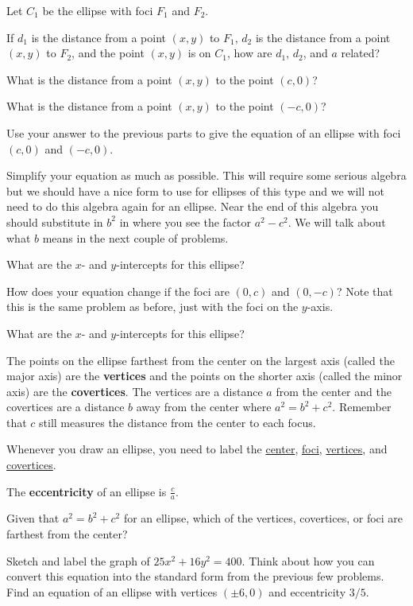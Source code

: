 \bq Let $C_1$ be the ellipse with foci $F_1$ and $F_2$.
\be
\item If $d_1$ is the distance from a point $(x,y)$ to $F_1$, $d_2$ is the distance from a point $(x,y)$ to $F_2$, and the point $(x,y)$ is on $C_1$, how are $d_1$, $d_2$, and $a$ related?
\item What is the distance from a point $(x,y)$ to the point $(c,0)$?
\item What is the distance from a point $(x,y)$ to the point $(-c,0)$?
\item Use your answer to the previous parts to give the equation of an ellipse with foci $(c,0)$ and $(-c,0)$.
\item Simplify your equation as much as possible. This will require some serious algebra but we should have a nice form to use for ellipses of this type and we will not need to do this algebra again for an ellipse. Near the end of this algebra you should substitute in $b^2$ in where you see the factor $a^2-c^2$. We will talk about what $b$ means in the next couple of problems.
\item What are the $x$- and $y$-intercepts for this ellipse?
\ee \eq

\bq \be
\item How does your equation change if the foci are $(0,c)$ and $(0,-c)$? Note that this is the same problem as before, just with the foci on the $y$-axis.
\item What are the $x$- and $y$-intercepts for this ellipse?
\ee \eq

\begin{info}
The points on the ellipse farthest from the center on the largest axis (called the major axis) are the \textbf{vertices} and the points on the shorter axis (called the minor axis) are the \textbf{covertices}. The vertices are a distance $a$ from the center and the covertices are a distance $b$ away from the center where $a^2=b^2+c^2$. Remember that $c$ still measures the distance from the center to each focus.

Whenever you draw an ellipse, you need to label the \underline{center}, \underline{foci}, \underline{vertices}, and \underline{covertices}.

The \textbf{eccentricity} of an ellipse is $\frac{c}{a}$. \end{info}

\bq Given that $a^2=b^2+c^2$ for an ellipse, which of the vertices, covertices, or foci are farthest from the center? \eq

\bq Sketch and label the graph of $25x^2+16y^2=400$. Think about how you can convert this equation into the standard form from the previous few problems.
\eq
\bq Find an equation of an ellipse with vertices $(\pm 6,0)$ and eccentricity $3/5$. \eq

